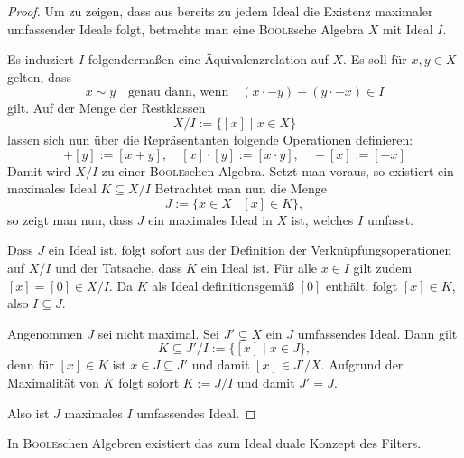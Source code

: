\begin{proof}
  
  Um zu zeigen, dass aus \PIT bereits zu jedem Ideal die Existenz maximaler umfassender Ideale folgt, betrachte man eine \textsc{Boole}sche Algebra $X$ mit Ideal $I$.
  
  Es induziert $I$ folgendermaßen eine Äquivalenzrelation auf $X$.
  Es soll für $x,y \in X$ gelten, dass 
  \begin{displaymath}
    x \sim y \quad \text{genau dann, wenn} \quad (x \cdot -y) + (y \cdot -x) \in I
  \end{displaymath}
  gilt.
  Auf der Menge der Restklassen 
  \begin{displaymath}
    X / I := \{[x] \mid x \in X\}
  \end{displaymath}
  lassen sich nun über die Repräsentanten folgende Operationen definieren:
  \begin{displaymath}
    [x] + [y] := [x+y], \quad
    [x] \cdot [y] := [x \cdot y], \quad
    -[x] := [-x]
  \end{displaymath}
  Damit wird $X/I$ zu einer \textsc{Boole}schen Algebra.
  Setzt man \PIT voraus, so existiert ein maximales Ideal $K \subseteq X/I$
  Betrachtet man nun die Menge
  \begin{displaymath}
    J := \{x \in X \mid [x] \in K\},
  \end{displaymath}
  so zeigt man nun, dass $J$ ein maximales Ideal in $X$ ist, welches $I$ umfasst.
  
  Dass $J$ ein Ideal ist, folgt sofort aus der Definition der Verknüpfungsoperationen auf $X/I$ und der Tatsache, dass $K$ ein Ideal ist.
  Für alle $x \in I$ gilt zudem $[x] = [0] \in X/I$. 
  Da $K$ als Ideal definitionsgemäß $[0]$ enthält, folgt $[x] \in K$, also $I \subseteq J$.
  
  Angenommen $J$ sei nicht maximal. Sei $J' \subsetneq X$ ein $J$ umfassendes Ideal.
  Dann gilt 
  \begin{displaymath}
    K \subseteq J'/I := \{[x] \mid x \in J\},
  \end{displaymath}
  denn für $[x] \in K$ ist $x \in J \subseteq J'$ und damit $[x] \in J'/X$.
  Aufgrund der Maximalität von $K$ folgt sofort $K := J/I$ und damit $J' = J$.

  Also ist $J$ maximales $I$ umfassendes Ideal.
\end{proof}

In \textsc{Boole}schen Algebren existiert das zum Ideal duale Konzept des Filters. 

